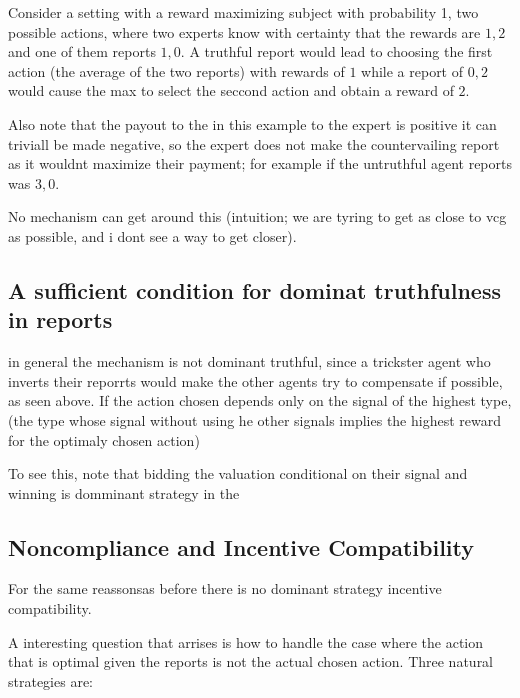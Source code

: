 \begin{eg}
	Consider a setting with a reward maximizing subject with probability 1, two possible actions, where two experts know with certainty that the rewards are $1,2$ and one of them reports $1,0$. A truthful report would lead to choosing the first action (the average of the two reports) with rewards of $1$ while a report of $0,2$ would cause the max to select the seccond action and obtain a reward of $2$.
\end{eg}

Also note that the payout to the in this example to the expert is positive it can triviall be made negative, so the expert does not make the countervailing report as it wouldnt maximize their payment; for example if the untruthful agent reports was $3,0$.

\begin{con}
	No mechanism can get around this (intuition; we are tyring to get as close to vcg as possible, and i dont see a way to get closer).
\end{con}

\subsection{A sufficient condition for dominat truthfulness in reports}

in general the mechanism is not dominant truthful, since a trickster agent who inverts their reporrts would make the other agents try to compensate if possible, as seen above.
If the action chosen depends only on the signal of the highest type, (the type whose signal without using he other signals implies the highest reward for the optimaly chosen action) 

To see this, note that bidding the valuation conditional on their signal and winning is domminant strategy in the 

\subsection{Noncompliance and Incentive Compatibility}

For the same reassonsas before there is no dominant strategy incentive compatibility. 

A interesting question that arrises is how to handle the case where the action that is optimal given the reports is not the actual chosen action. Three natural strategies are:

